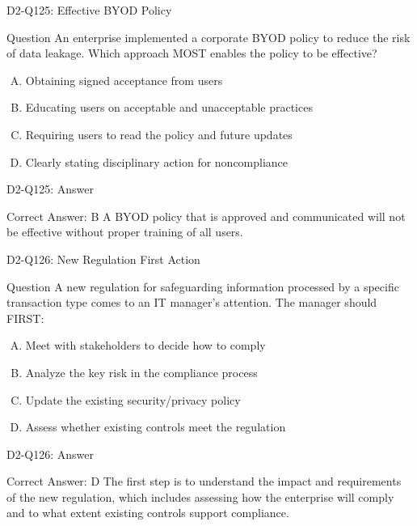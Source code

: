\documentclass{beamer}
\begin{document}
	\begin{frame}{D2-Q125: Effective BYOD Policy}
		\begin{block}{Question}
			An enterprise implemented a corporate BYOD policy to reduce the risk of data leakage. Which approach MOST enables the policy to be effective?
		\end{block}
		\begin{enumerate}[(A)]
			\item Obtaining signed acceptance from users
			\item Educating users on acceptable and unacceptable practices
			\item Requiring users to read the policy and future updates
			\item Clearly stating disciplinary action for noncompliance
		\end{enumerate}
	\end{frame}
	\begin{frame}{D2-Q125: Answer}
		\begin{block}{Correct Answer: B}
			A BYOD policy that is approved and communicated will not be effective without proper training of all users.
		\end{block}
	\end{frame}
	
	\begin{frame}{D2-Q126: New Regulation First Action}
		\begin{block}{Question}
			A new regulation for safeguarding information processed by a specific transaction type comes to an IT manager's attention. The manager should FIRST:
		\end{block}
		\begin{enumerate}[(A)]
			\item Meet with stakeholders to decide how to comply
			\item Analyze the key risk in the compliance process
			\item Update the existing security/privacy policy
			\item Assess whether existing controls meet the regulation
		\end{enumerate}
	\end{frame}
	\begin{frame}{D2-Q126: Answer}
		\begin{block}{Correct Answer: D}
			The first step is to understand the impact and requirements of the new regulation, which includes assessing how the enterprise will comply and to what extent existing controls support compliance.
		\end{block}
	\end{frame}
	
\end{document}
